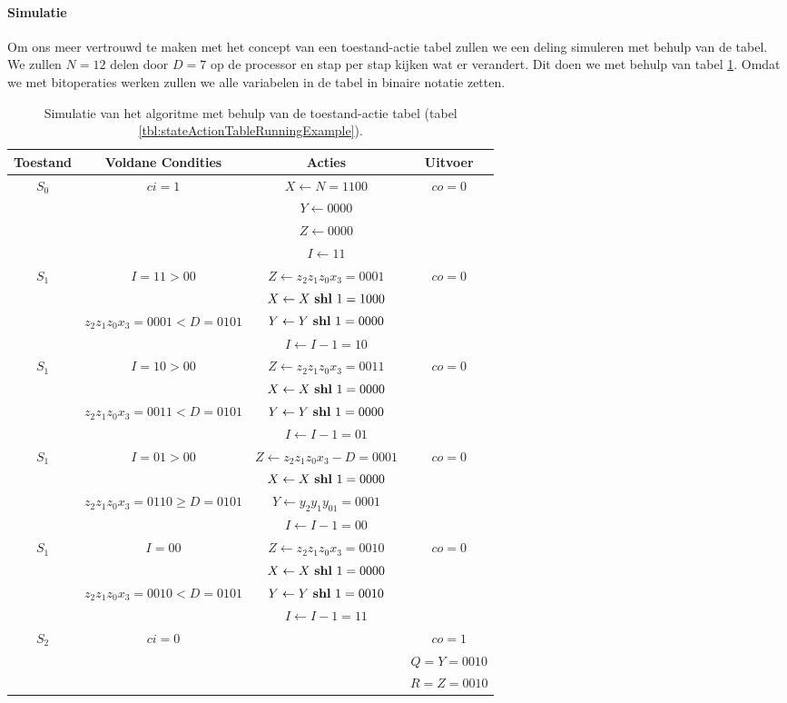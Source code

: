 \paragraph{Simulatie}Om ons meer vertrouwd te maken met het concept van een toestand-actie tabel zullen we een deling simuleren met behulp van de tabel. We zullen $N=12$ delen door $D=7$ op de processor en stap per stap kijken wat er verandert. Dit doen we met behulp van tabel \ref{tbl:stateActionTableRunningExampleSim}. Omdat we met bitoperaties werken zullen we alle variabelen in de tabel in binaire notatie zetten.
\begin{table}[hbt]
\centering
\begin{tabular}{c|c|c|c}
Toestand&Voldane Condities&Acties&Uitvoer\\\hline
\multirow{4}{*}{$S_0$}&\multirow{4}{*}{$ci=1$}&$X\gets N=1100$&\multirow{4}{*}{$co=0$}\\
&&$Y\gets0000$&\\
&&$Z\gets0000$&\\
&&$I\gets11$&\\\hline

\multirow{4}{*}{$S_1$}&\multirow{2}{*}{$I=11>00$}&$Z\gets z_2z_1z_0x_3=0001$&\multirow{4}{*}{$co=0$}\\
&&$X\gets X\mbox{ \textbf{shl} }{} 1=1000$&\\
&\multirow{2}{*}{$z_2z_1z_0x_3=0001<D=0101$}&$Y\gets Y\mbox{ \textbf{shl} }{} 1=0000$&\\
&&$I\gets I-1=10$&\\\hline

\multirow{4}{*}{$S_1$}&\multirow{2}{*}{$I=10>00$}&$Z\gets z_2z_1z_0x_3=0011$&\multirow{4}{*}{$co=0$}\\
&&$X\gets X\mbox{ \textbf{shl} }{} 1=0000$&\\
&\multirow{2}{*}{$z_2z_1z_0x_3=0011<D=0101$}&$Y\gets Y\mbox{ \textbf{shl} }{} 1=0000$&\\
&&$I\gets I-1=01$&\\\hline

\multirow{4}{*}{$S_1$}&\multirow{2}{*}{$I=01>00$}&$Z\gets z_2z_1z_0x_3-D=0001$&\multirow{4}{*}{$co=0$}\\
&&$X\gets X\mbox{ \textbf{shl} }{} 1=0000$&\\
&\multirow{2}{*}{$z_2z_1z_0x_3=0110\geq D=0101$}&$Y\gets y_2y_1y_01=0001$&\\
&&$I\gets I-1=00$&\\\hline

\multirow{4}{*}{$S_1$}&\multirow{2}{*}{$I=00$}&$Z\gets z_2z_1z_0x_3=0010$&\multirow{4}{*}{$co=0$}\\
&&$X\gets X\mbox{ \textbf{shl} }{} 1=0000$&\\
&\multirow{2}{*}{$z_2z_1z_0x_3=0010<D=0101$}&$Y\gets Y\mbox{ \textbf{shl} }{} 1=0010$&\\
&&$I\gets I-1=11$&\\\hline

\multirow{3}{*}{$S_2$}&\multirow{3}{*}{$ci=0$}&&$co=1$\\
&&&$Q=Y=0010$\\
&&&$R=Z=0010$\\
\end{tabular}
\caption{Simulatie van het algoritme met behulp van de toestand-actie tabel (tabel \ref{tbl:stateActionTableRunningExample}).}
\label{tbl:stateActionTableRunningExampleSim}
\end{table}
